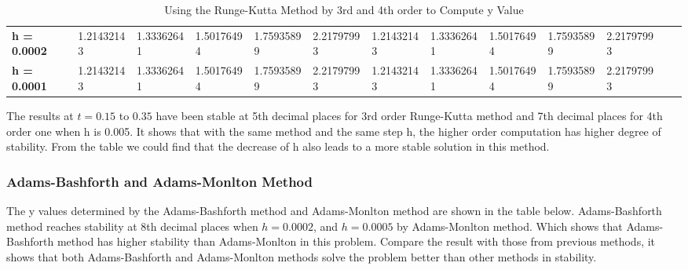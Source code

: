 \documentclass[a4paper]{article}
\begin{document}
\begin{table}[H]
{\begin{tabular}{@{}lllllllllllll@{}}
    \textbf{h = 0.0002}             & 1.21432143                & 1.33362641                            & 1.50176494                            & 1.75935899                            & 2.21797993                                                         & 1.21432143                             & 1.33362641                            & 1.50176494                            & 1.75935899       & 2.21797993               \\
    \textbf{h = 0.0001}             & 1.21432143                             & 1.33362641                            & 1.50176494                            & 1.75935899                            & 2.21797993                                                         & 1.21432143                             & 1.33362641                            & 1.50176494                            & 1.75935899       & 2.21797993              \\
    \bottomrule
    \end{tabular}%
    }
    \caption{Using the Runge-Kutta Method by 3rd and 4th order to Compute y Value}
    \label{tab:IVP2_RK}
    \end{table}

    The results at $t = 0.15$ to $0.35$ have been stable at 5th decimal places for 3rd order Runge-Kutta method and 7th decimal places for 4th order one when h is 0.005. It shows that with the same method and the same step h, the higher order computation has higher degree of stability. From the table we could find that the decrease of h also leads to a more stable solution in this method. 
    
    \subsubsection{Adams-Bashforth and Adams-Monlton Method}
    
    The y values determined by the Adams-Bashforth method and Adams-Monlton method are shown in the table below. Adams-Bashforth method reaches stability at 8th decimal places when $h = 0.0002$, and $h = 0.0005$ by Adams-Monlton method. Which shows that Adams-Bashforth method has higher stability than Adams-Monlton in this problem. Compare the result with those from previous methods, it shows that both Adams-Bashforth and Adams-Monlton methods solve the problem better than other methods in stability.
    
\end{document}
